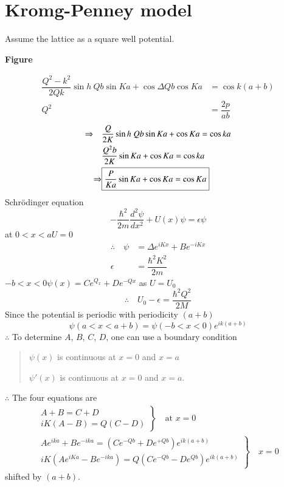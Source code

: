 \section*{Kromg-Penney model}

Assume the lattice as a square well potential.
\begin{center}
{\bf Figure}
\end{center}
\begin{align*}
\dfrac{Q^{2}-k^{2}}{2Qk}\sin h \ Qb \sin Ka+\cos \Delta Qb \cos Ka &= \cos k(a+b)\\
Q^{2} &= \dfrac{2p}{ab}
\end{align*}
\begin{align*}
\Rightarrow\quad & \dfrac{Q}{2K}\sin h \ Qb\sin Ka+\cos Ka = \cos ka\\
& \dfrac{Q^{2}b}{2K}\sin Ka +\cos Ka = \cos ka\\
\Rightarrow & \fbox{$\dfrac{P}{Ka}\sin Ka+\cos Ka = \cos Ka$}
\end{align*}
Schr\"odinger equation
$$
-\dfrac{\hbar^{2}}{2m}\dfrac{d^{2}\psi}{dx^{2}}+U(x)\psi = \epsilon \psi
$$
at $0<x<a$\quad $U=0$
\begin{align*}
\therefore\quad \psi &= \Delta e^{iKx}+Be^{-iKx}\\
\epsilon &= \dfrac{\hbar^{2}K^{2}}{2m}
\end{align*}
$-b<x<0$\quad $\psi(x)=Ce^{Q_{x}}+De^{-Qx}$ as $U=U_{0}$
$$
\therefore\quad U_{0}-\epsilon = \dfrac{\hbar^{2}Q^{2}}{2M}
$$
Since the potential is periodic with periodicity $(a+b)$
$$
\psi(a<x<a+b)=\psi(-b<x<0)e^{ik(a+b)}
$$
$\therefore$ To determine $A$, $B$, $C$, $D$, one can use a boundary condition
\begin{quote}
$\psi(x)$ is continuous at $x=0$ and $x=a$

$\psi'(x)$ is continuous at $x=0$ and $x=a$.
\end{quote}
$\therefore$ The four equations are
\begin{gather*}
\left.
\begin{array}{c}
A+B=C+D\\
iK(A-B)=Q(C-D)
\end{array}
\right\} \quad \text{at } x=0\\
\left.
\begin{array}{c}
Ae^{ika}+Be^{-ika}=(Ce^{-Qb}+De^{+Qb})e^{ik(a+b)}\\
iK (Ae^{iKa}-Be^{-ika})=Q(Ce^{-Qb}-De^{Qb})e^{ik(a+b)}
\end{array}
\right\}\quad x=0
\end{gather*}
shifted by $(a+b)$.

